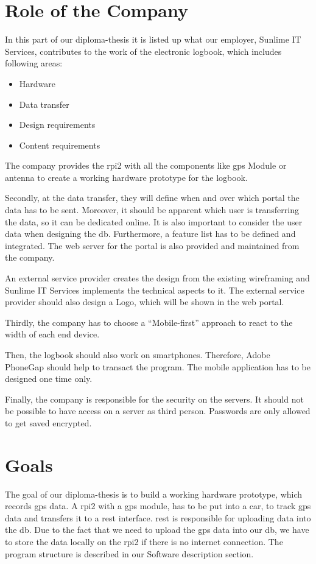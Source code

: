 \section*{Role of the Company}
In this part of our diploma-thesis it is listed up what our employer, Sunlime IT Services, contributes to the work of the electronic logbook, which includes following areas:
\begin{itemize}
\item Hardware
\item Data transfer
\item Design requirements
\item Content requirements
\end{itemize}
The company provides the \gls{rpi2} with all the components like \gls{gps} Module or antenna to create a working hardware prototype for the logbook.

Secondly, at the data transfer, they will define when and over which portal the data has to be sent. Moreover, it should be apparent which user is transferring the data, so it can be dedicated online. It is also important to consider the user data when designing the \gls{db}. Furthermore, a feature list has to be defined and integrated.
The web server for the portal is also provided and maintained from the company.

An external service provider creates the design from the existing wireframing and Sunlime IT Services implements the technical aspects to it. The external service provider should also design a Logo, which will be shown in the web portal.

Thirdly, the company has to choose a “Mobile-first” approach to react to the width of each end device.

Then, the logbook should also work on smartphones. Therefore, Adobe PhoneGap should help to transact the program. The mobile application has to be designed one time only.

Finally, the company is responsible for the security on the servers. It should not be possible to have access on a server as third person. Passwords are only allowed to get saved encrypted.
\newpage
\section*{Goals}
The goal of our diploma-thesis is to build a working hardware prototype, which records \gls{gps} data. A \gls{rpi2} with a \gls{gps} module, has to be put into a car, to track \gls{gps} data and transfers it to a \gls{rest} interface. \gls{rest} is responsible for uploading data into the \gls{db}. Due to the fact that we need to upload the \gls{gps} data into our \gls{db}, we have to store the data locally on the \gls{rpi2} if there is no internet connection. The program structure is described in our Software description section.

